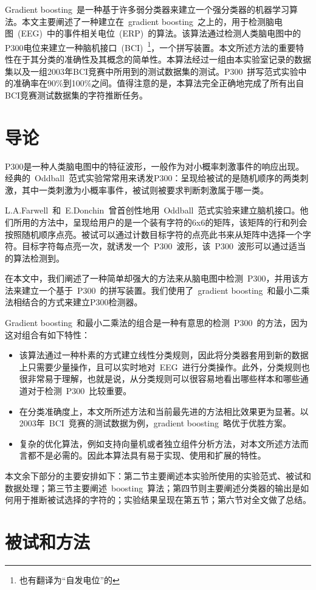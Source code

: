 \documentclass[a4paper]{ecusttrans}
\begin{document}
  \setlength{\parindent}{2em}
  \sloppy
  \CJKtilde

  \begin{cAbstract}
  Gradient boosting~是一种基于许多弱分类器来建立一个强分类器的机器学习算法。本文主要阐述了一种建立在~gradient boosting~之上的，用于检测脑电图~(EEG)~中的事件相关电位~(ERP)~的算法。该算法通过检测人类脑电图中的P300电位来建立一种脑机接口~(BCI)~\footnote{也有翻译为{“自发电位”}的}，一个拼写装置。本文所述方法的重要特性在于其分类的准确性及其概念的简单性。本算法经过一组由本实验室记录的数据集以及一组2003年BCI竞赛中所用到的测试数据集的测试。P300~拼写范式实验中的准确率在90\%到100\%之间。值得注意的是，本算法完全正确地完成了所有出自BCI竞赛测试数据集的字符推断任务。

  \end{cAbstract}

  \wuhao
  \section{导论}
  P300是一种人类脑电图中的特征波形，一般作为对小概率刺激事件的响应出现。经典的~Oddball~范式实验常常用来诱发P300：呈现给被试的是随机顺序的两类刺激，其中一类刺激为小概率事件，被试则被要求判断刺激属于哪一类。

  L.A.Farwell~和~E.Donchin~曾首创性地用~Oddball~范式实验来建立脑机接口。他们所用的方法中，呈现给用户的是一个装有字符的6x6的矩阵，该矩阵的行和列会按照随机顺序点亮。被试可以通过计数目标字符的点亮此书来从矩阵中选择一个字符。目标字符每点亮一次，就诱发一个~P300~波形，该~P300~波形可以通过适当的算法检测到。

  在本文中，我们阐述了一种简单却强大的方法来从脑电图中检测~P300，并用该方法来建立一个基于~P300~的拼写装置。我们使用了~gradient boosting~和最小二乘法相结合的方式来建立P300检测器。

  Gradient boosting~和最小二乘法的组合是一种有意思的检测~P300~的方法，因为这对组合有如下特性：

  \begin{itemize}
    \item 该算法通过一种朴素的方式建立线性分类规则，因此将分类器套用到新的数据上只需要少量操作，且可以实时地对~EEG~进行分类操作。此外，分类规则也很非常易于理解，也就是说，从分类规则可以很容易地看出哪些样本和哪些通道对于检测~P300~比较重要。
    \item 在分类准确度上，本文所所述方法和当前最先进的方法相比效果更为显著。以2003年~BCI~竞赛的测试数据为例，gradient boosting~略优于优胜方案。
    \item 复杂的优化算法，例如支持向量机或者独立组件分析方法，对本文所述方法而言都不是必需的。因此本算法具有易于实现、使用和扩展的特性。
  \end{itemize}

  本文余下部分的主要安排如下：第二节主要阐述本实验所使用的实验范式、被试和数据处理；第三节主要阐述~boosting~算法；第四节则主要阐述分类器的输出是如何用于推断被试选择的字符的；实验结果呈现在第五节；第六节对全文做了总结。
  \section{被试和方法}
\end{document}
